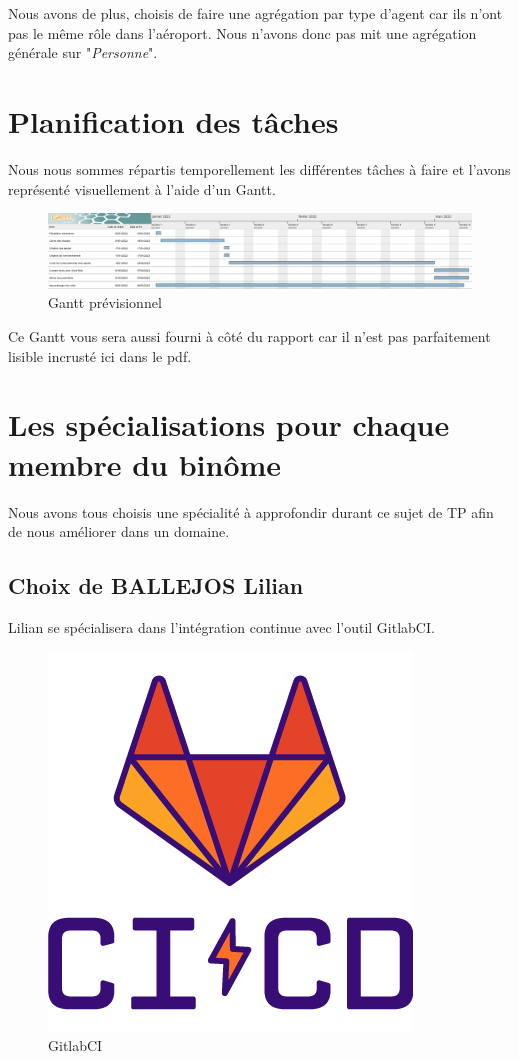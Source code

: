 \documentclass[12pt,french]{article} %
\begin{document}
Nous avons de plus, choisis de faire une agrégation par type d'agent car ils n'ont pas le même rôle dans l'aéroport. Nous n'avons donc pas mit une agrégation générale sur "\textit{Personne}". 


\section{Planification des tâches}

Nous nous sommes répartis temporellement les différentes tâches à faire et l'avons représenté visuellement à l'aide d'un Gantt.

\begin{figure}[H]
	\centering
	\includegraphics[scale=0.35]{gantt.png}
	\caption{Gantt prévisionnel}    
\end{figure}

\bigskip

Ce Gantt vous sera aussi fourni à côté du rapport car il n'est pas parfaitement lisible incrusté ici dans le pdf.

\section{Les spécialisations pour chaque membre du binôme}

Nous avons tous choisis une spécialité à approfondir durant ce sujet de TP afin de nous améliorer dans un domaine.

\subsection{Choix de BALLEJOS Lilian}

Lilian se spécialisera dans l'intégration continue avec l'outil GitlabCI.

\begin{figure}[H]
	\centering
	\includegraphics[scale=0.35]{clilian.png}
	\caption{GitlabCI}    
\end{figure}
\end{document}

